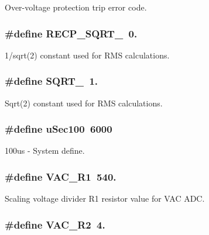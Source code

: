 Over-\/voltage protection trip error code. \hypertarget{a00043_ae468f418f2e6410dfcfeb58bcbbde516}{
\subsubsection[{R\-E\-C\-P\-\_\-\-S\-Q\-R\-T\-\_\-2}]{\setlength{\rightskip}{0pt plus 5cm}\#define R\-E\-C\-P\-\_\-\-S\-Q\-R\-T\-\_~0.}}\label{a00043_ae468f418f2e6410dfcfeb58bcbbde516}
1/sqrt(2) constant used for R\-M\-S calculations. \hypertarget{a00043_abc63ab2a8e7782de38a5dbdfc33da717}{
\subsubsection[{S\-Q\-R\-T\-\_\-2}]{\setlength{\rightskip}{0pt plus 5cm}\#define S\-Q\-R\-T\-\_~1.}}\label{a00043_abc63ab2a8e7782de38a5dbdfc33da717}
Sqrt(2) constant used for R\-M\-S calculations. \hypertarget{a00043_aa010c11f88da0f9a48a7dfd810412d5d}{
\subsubsection[{u\-Sec100}]{\setlength{\rightskip}{0pt plus 5cm}\#define u\-Sec100~6000}}\label{a00043_aa010c11f88da0f9a48a7dfd810412d5d}
100us -\/ System define. \hypertarget{a00043_a67fad1f78c49251e39fa6f1d5ff43e9e}{
\subsubsection[{V\-A\-C\-\_\-\-R1}]{\setlength{\rightskip}{0pt plus 5cm}\#define V\-A\-C\-\_\-\-R1~540.}}\label{a00043_a67fad1f78c49251e39fa6f1d5ff43e9e}
Scaling voltage divider R1 resistor value for V\-A\-C A\-D\-C. \hypertarget{a00043_a087778c4195e73f588e5c3cf7d9e9206}{
\subsubsection[{V\-A\-C\-\_\-\-R2}]{\setlength{\rightskip}{0pt plus 5cm}\#define V\-A\-C\-\_\-\-R2~4.}}\label{a00043_a087778c4195e73f588e5c3cf7d9e9206}
